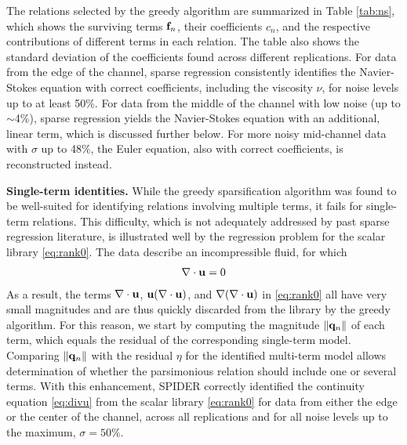 \documentclass[9pt,twocolumn,twoside,lineno]{pnas-new}
\begin{document}
The relations selected by the greedy algorithm are summarized in Table \ref{tab:ns}, which shows the surviving terms ${\bf f}_n$, their coefficients $c_n$, and the respective contributions of different terms in each relation. The table also shows the standard deviation of the coefficients found across different replications. For data from the edge of the channel, sparse regression consistently identifies the Navier-Stokes equation with correct coefficients, including the viscosity $\nu$, for noise levels up to at least 50\%. For data from the middle of the channel with low noise (up to $\sim$4\%), sparse regression yields the Navier-Stokes equation with an additional, linear term, which is discussed further below. For more noisy mid-channel data with $\sigma$ up to 48\%, the Euler equation, also with correct coefficients, is reconstructed instead.

{\bf Single-term identities.} While the greedy sparsification algorithm was found to be well-suited for identifying relations involving multiple terms, it fails for single-term relations. This difficulty, which is not adequately addressed by past sparse regression literature, is illustrated well by the regression problem for the scalar library \eqref{eq:rank0}. The data describe an incompressible fluid, for which 
\begin{align}\label{eq:divu}
    \nabla\cdot{\bf u}=0
\end{align}
As a result, the terms $\nabla\cdot{\bf u}$, ${\bf u}(\nabla\cdot{\bf u})$, and $\nabla(\nabla\cdot{\bf u})$ in \eqref{eq:rank0} all have very small magnitudes and are thus quickly discarded from the library by the greedy algorithm. 
For this reason, we start by computing the magnitude $\|{\bf q}_n\|$ of each term, which equals the residual of the corresponding single-term model. Comparing $\|{\bf q}_n\|$ with the residual $\eta$ for the identified multi-term model allows determination of whether the parsimonious relation should include one or several terms. With this enhancement, SPIDER correctly identified the continuity equation \eqref{eq:divu} from the scalar library \eqref{eq:rank0} for data from either the edge or the center of the channel, across all replications and for all noise levels up to the maximum, $\sigma = 50\%$.
\end{document}
